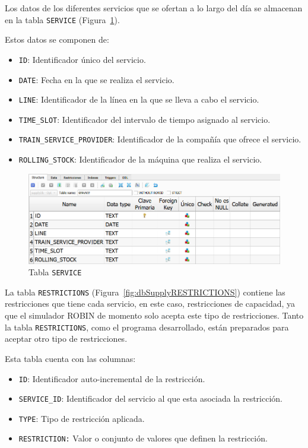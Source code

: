 Los datos de los diferentes servicios que se ofertan a lo largo del día se almacenan en la tabla \texttt{SERVICE} (Figura~\ref{fig:dbSupplySERVICE}). 

Estos datos se componen de: 
\begin{itemize}
    \item \texttt{ID}: Identificador único del servicio.
    \item \texttt{DATE}: Fecha en la que se realiza el servicio.
    \item \texttt{LINE}: Identificador de la línea en la que se lleva a cabo el servicio.
    \item \texttt{TIME\_SLOT}: Identificador del intervalo de tiempo asignado al servicio.
    \item \texttt{TRAIN\_SERVICE\_PROVIDER}: Identificador de la compañía que ofrece el servicio.
    \item \texttt{ROLLING\_STOCK}: Identificador de la máquina que realiza el servicio.
\end{itemize}

\begin{figure}[H]
\centering
\includegraphics[width=.9\textwidth]{fig/Tablas base de datos/Oferta/SERVICE.png}
\caption{Tabla \texttt{SERVICE}}
\label{fig:dbSupplySERVICE}
\end{figure}

La tabla \texttt{RESTRICTIONS} (Figura~\ref{fig:dbSupplyRESTRICTIONS}) contiene las restricciones que tiene cada servicio, en este caso, restricciones de capacidad, ya que el simulador \acrshort{ROBIN} de momento solo acepta este tipo de restricciones. Tanto la tabla \texttt{RESTRICTIONS}, como el programa desarrollado, están preparados para aceptar otro tipo de restricciones.

Esta tabla cuenta con las columnas:
\begin{itemize}
    \item \texttt{ID}: Identificador auto-incremental de la restricción.
    \item \texttt{SERVICE\_ID}: Identificador del servicio al que esta asociada la restricción.
    \item \texttt{TYPE}: Tipo de restricción aplicada.
    \item \texttt{RESTRICTION:} Valor o conjunto de valores que definen la restricción.
\end{itemize}

